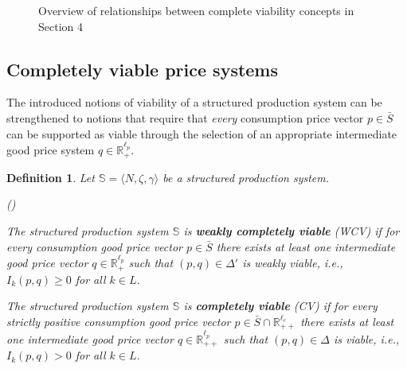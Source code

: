 \documentclass[11pt,fleqn]{article}
\newcounter{llst}
\newenvironment{abet}{\begin{list}{\rm (\alph{llst})}{\usecounter{llst}
		\setlength{\itemindent}{0em} \setlength{\leftmargin}{3em}
		\setlength{\labelwidth}{2em} \setlength{\labelsep}{1em}}}{\end{list}}
\newtheorem{definition}[theorem]{Definition}
\newcommand{\rx}[1]{%
  \draw[red, line width=1.3pt] ($#1+(-0.16,-0.16)$) -- ($#1+(0.16,0.16)$);
  \draw[red, line width=1.3pt] ($#1+(-0.16, 0.16)$) -- ($#1+(0.16,-0.16)$);
}
\begin{document}
\begin{figure}[h]
	\caption{Overview of relationships between complete viability concepts in Section 4} \label{fig:relations4}
\end{figure}

\subsection{Completely viable price systems}\label{sec: compl viable}

The introduced notions of viability of a structured production system can be strengthened to notions that require that \emph{every} consumption price vector $p \in \bar S$ can be supported as viable through the selection of an appropriate intermediate good price system $q \in \mathbb R^{\ell_p}_+$. 

\begin{definition}
	Let $\mathbb S = \langle N, \zeta , \gamma \rangle$ be a structured production system. 
	\begin{abet}
		\item The structured production system $\mathbb S$ is \textbf{weakly completely viable} (WCV) if for every consumption good price vector $p \in \bar S $ there exists at least one intermediate good price vector $q \in \mathbb R^{\ell_p}_+$ such that $(p,q) \in \Delta'$  is weakly viable, i.e., $I_k (p,q) \geqslant 0$ for all $k \in L$.
		\item The structured production system $\mathbb S$ is \textbf{completely viable} (CV) if for every strictly positive consumption good price vector $p \in \bar S \cap \mathbb R^{\ell_c}_{++}$ there exists at least one intermediate good price vector $q \in \mathbb R^{\ell_p}_{++}$ such that $(p,q) \in \Delta$ is viable, i.e., $I_k (p,q) > 0$ for all $k \in L$.
	\end{abet}
\end{definition}
\end{document}
